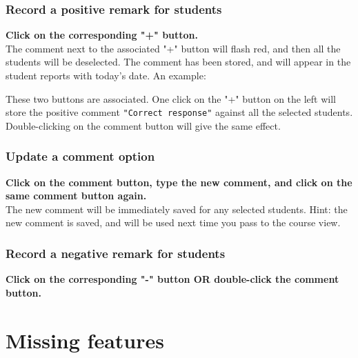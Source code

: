 \documentclass[10pt]{article}
\begin{document}
\subsubsection{Record a positive remark for students}
\textbf{Click on the corresponding "+" button.} \\
The comment next to the associated "+" button will flash red, and then all the students will be deselected. The comment has been stored, and will appear in the student reports with today's date. An example:
\begin{center}
\end{center}
These two buttons are associated. One click on the "+" button on the left will store the positive comment \texttt{"Correct response"} against all the selected students. Double-clicking on the comment button will give the same effect.

\subsubsection{Update a comment option}
\textbf{Click on the comment button, type the new comment, and click on the same comment button again.} \\
The new comment will be immediately saved for any selected students. 
Hint: the new comment is saved, and will be used next time you pass to the course view.

\subsubsection{Record a negative remark for students}
\textbf{Click on the corresponding "-" button OR double-click the comment button.} \\




\section{Missing features} \label{notdone} 
\end{document}
